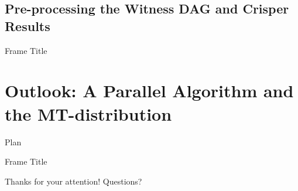 \documentclass{beamer}
\begin{document}
\subsection{Pre-processing the Witness DAG and Crisper Results}
\begin{frame}{Frame Title}
    
\end{frame}

\section{Outlook: A Parallel Algorithm and the MT-distribution}
\begin{frame}{Plan}
\tableofcontents[currentsection, sectionstyle=show/shaded, hideothersubsections]
\end{frame}
\begin{frame}{Frame Title}
    
\end{frame}

\begin{frame}{}
    \centering \large
    Thanks for your attention!
    Questions?
\end{frame}
\end{document}

